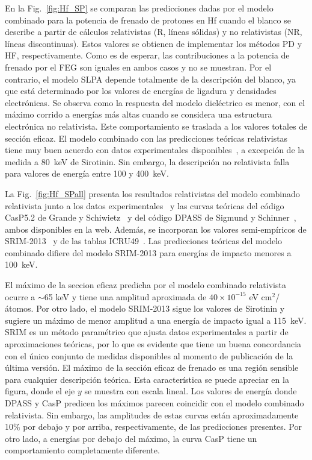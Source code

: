 En la Fig.~\ref{fig:Hf_SP} se comparan las predicciones dadas por el 
modelo combinado para la potencia de frenado de protones en Hf
cuando el blanco se describe a partir de cálculos relativistas (R, 
líneas sólidas) y no relativistas (NR, líneas discontinuas). Estos 
valores se obtienen de implementar los métodos PD y HF, respectivamente.
Como es de esperar, las contribuciones a la potencia de frenado por el 
FEG son iguales en ambos casos y no se muestran. Por el contrario, el 
modelo SLPA depende totalmente de la descripción del blanco, ya que está 
determinado por los valores de energías de ligadura y densidades 
electrónicas. Se observa como la respuesta del modelo dieléctrico es 
menor, con el máximo corrido a energías más altas cuando se considera 
una estructura electrónica no relativista. Este comportamiento se 
traslada a los valores totales de sección eficaz. El modelo combinado 
con las predicciones teóricas relativistas tiene muy buen acuerdo con 
datos experimentales disponibles~\cite{Montanari:20,Sirotinin:84}, a 
excepción de la medida a 80~keV de Sirotinin. Sin embargo, la 
descripción no relativista falla para valores de energía entre 100 y 
400~keV. 


La Fig.~\ref{fig:Hf_SPall} presenta los resultados relativistas del 
modelo combinado relativista junto a los datos 
experimentales~\cite{Montanari:20,Sirotinin:84} y las curvas teóricas 
del código CasP5.2 de Grande y Schiwietz~\cite{Grande:01,casp52} y del 
código DPASS de Sigmund y Schinner~\cite{DPASS20}, ambos disponibles en 
la web. Además, se incorporan los valores semi-empíricos de 
SRIM-2013~\cite{Ziegler01} y de las tablas ICRU49~\cite{ICRU49}. 
Las predicciones teóricas del modelo combinado difiere del modelo 
SRIM-2013 para energías de impacto menores a 100~keV. 

El máximo de la seccion eficaz predicha por el modelo combinado 
relativista ocurre a $\sim$65 keV y tiene una amplitud aproximada de 
$40\times 10^{-15}$ eV cm$^2$/átomos. Por otro lado, el modelo SRIM-2013
sigue los valores de Sirotinin y sugiere un máximo de menor amplitud a 
una energía de impacto igual a 115~keV. SRIM es un método paramétrico 
que ajusta datos experimentales a partir de aproximaciones teóricas, 
por lo que es evidente que tiene un buena concordancia con el único 
conjunto de medidas disponibles al momento de publicación de la última
versión. El máximo de la sección eficaz de frenado es una región 
sensible para cualquier descripción teórica. Esta característica se 
puede apreciar en la figura, donde el eje $y$ se muestra con escala 
lineal. Los valores de energía donde DPASS y CasP predicen los máximos 
parecen coincidir con el modelo combinado relativista. Sin embargo, las 
amplitudes de estas curvas están aproximadamente 10\% por debajo y 
por arriba, respectivamente, de las predicciones presentes. Por otro 
lado, a energías por debajo del máximo, la curva CasP tiene un 
comportamiento completamente diferente. 

